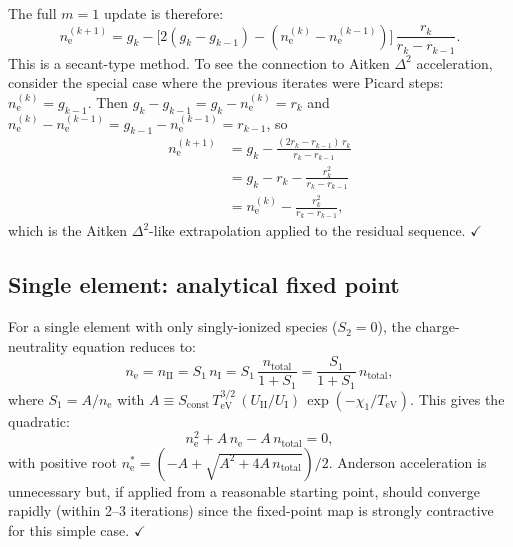 \documentclass[11pt]{article}
\newcommand{\ne}{n_\mathrm{e}}
\newcommand{\TeV}{T_\mathrm{eV}}
\newcommand{\Sconst}{S_\mathrm{const}}
\begin{document}
The full $m=1$ update is therefore:
%
\begin{equation}
  \label{eq:m1-full}
  \ne^{(k+1)}
  = g_k - \bigl[2(g_k - g_{k-1}) - (\ne^{(k)} - \ne^{(k-1)})\bigr]\,
    \frac{r_k}{r_k - r_{k-1}}.
\end{equation}
%
This is a secant-type method.  To see the connection to Aitken
$\Delta^2$ acceleration, consider the special case where the previous
iterates were Picard steps: $\ne^{(k)} = g_{k-1}$.  Then
$g_k - g_{k-1} = g_k - \ne^{(k)}= r_k$ and
$\ne^{(k)} - \ne^{(k-1)} = g_{k-1} - \ne^{(k-1)} = r_{k-1}$, so
%
\begin{align}
  \ne^{(k+1)}
  &= g_k - \frac{(2r_k - r_{k-1})\,r_k}{r_k - r_{k-1}} \nonumber\\
  &= g_k - r_k - \frac{r_k^2}{r_k - r_{k-1}} \nonumber\\
  &= \ne^{(k)} - \frac{r_k^2}{r_k - r_{k-1}},
  \label{eq:aitken}
\end{align}
%
which is the Aitken $\Delta^2$-like extrapolation applied to the
residual sequence. $\checkmark$


\subsection{Single element: analytical fixed point}

For a single element with only singly-ionized species ($S_2 = 0$), the
charge-neutrality equation reduces to:
%
\begin{equation}
  \ne = n_\mathrm{II} = S_1\,n_\mathrm{I}
  = S_1\,\frac{n_\mathrm{total}}{1 + S_1}
  = \frac{S_1}{1 + S_1}\,n_\mathrm{total},
\end{equation}
%
where $S_1 = A/\ne$ with $A \equiv \Sconst\,\TeV^{3/2}\,(U_\mathrm{II}/U_\mathrm{I})\,\exp(-\chi_1/\TeV)$.
This gives the quadratic:
%
\begin{equation}
  \ne^2 + A\,\ne - A\,n_\mathrm{total} = 0,
\end{equation}
%
with positive root $\ne^* = (-A + \sqrt{A^2 + 4A\,n_\mathrm{total}})/2$.
Anderson acceleration is unnecessary but, if applied from a reasonable
starting point, should converge rapidly (within 2--3 iterations) since
the fixed-point map is strongly contractive for this simple case. $\checkmark$
\end{document}
